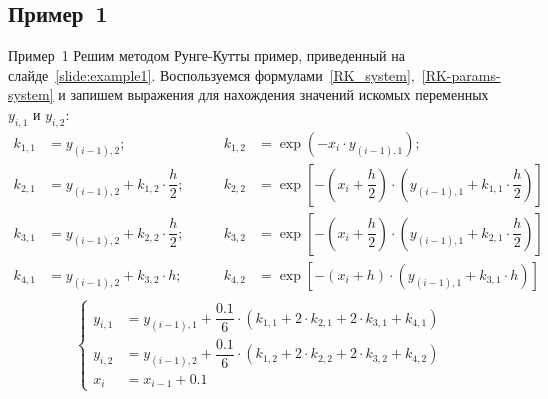 \documentclass[aspectratio=169, mathserif]{beamer}	%
\begin{document}
\subsection{Пример~1}
\begin{frame}[fragile, ]{Пример~1}
\scriptsize
Решим  методом Рунге-Кутты пример, приведенный на слайде~\ref{slide:example1}.
Воспользуемся формулами~\eqref{RK_system},~\eqref{RK-params-system} и запишем выражения для нахождения значений искомых переменных $y_{i,1}$ и $y_{i,2}$:
\vfill
\begin{equation*}
	\begin{aligned}
		k_{1,1} &= y_{(i-1),2}; &\qquad
		k_{1,2} &= \exp\left(-x_i\cdot y_{(i-1),1}\right); \\
		k_{2,1} &= y_{(i-1),2} + k_{1,2}\cdot \dfrac{h}{2}; &\qquad
		k_{2,2} &= \exp\left[-\left(x_i + \dfrac{h}{2}\right) \cdot \left(y_{(i-1),1} + k_{1,1} \cdot \dfrac{h}{2}\right)\right] \\
		k_{3,1} &= y_{(i-1),2} + k_{2,2}\cdot \dfrac{h}{2}; &\qquad
		k_{3,2} &= \exp\left[-\left(x_i + \dfrac{h}{2}\right) \cdot \left(y_{(i-1),1} + k_{2,1} \cdot \dfrac{h}{2}\right)\right] \\
		k_{4,1} &= y_{(i-1),2} + k_{3,2} \cdot h; &\qquad
		k_{4,2} &= \exp\left[-\left(x_i + h\right) \cdot \left(y_{(i-1),1} + k_{3,1} \cdot h\right)\right] \\
	\end{aligned}
\end{equation*}
\vfill
\begin{equation*}
	\left\{
	\begin{aligned}
		y_{i,1} &= y_{(i-1),1} + \dfrac{0.1}{6} \cdot \left(k_{1,1} + 2\cdot k_{2,1} + 2 \cdot k_{3,1} + k_{4,1}\right) \\
		y_{i,2} &= y_{(i-1),2} + \dfrac{0.1}{6} \cdot \left(k_{1,2} + 2\cdot k_{2,2} + 2 \cdot k_{3,2} + k_{4,2}\right) \\
		x_{i} &= x_{i-1} + 0.1
	\end{aligned}
	\right.
\end{equation*}
\vfill
\end{frame}
\end{document}
